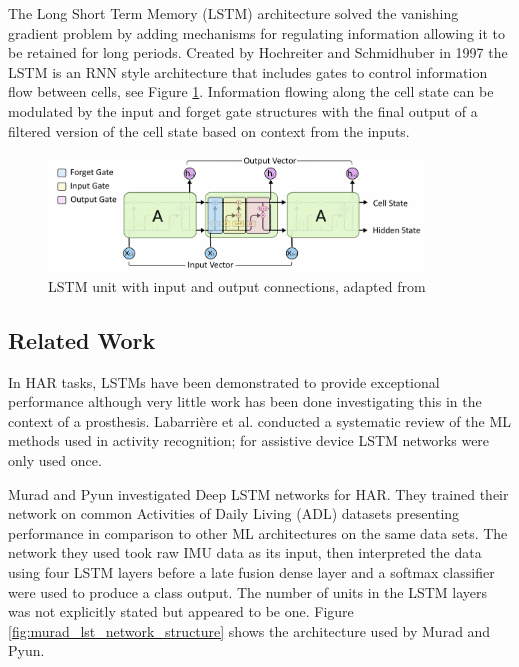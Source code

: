 \documentclass[sensors,article,submit,moreauthors,pdftex]{Definitions/mdpi}
\begin{document}
The Long Short Term Memory (LSTM) architecture solved the vanishing gradient problem by adding mechanisms for regulating information allowing it to be retained for long periods. Created by Hochreiter and Schmidhuber in 1997\cite{Hochreiter1997} the LSTM is an RNN style architecture that includes gates to control information flow between cells, see Figure \ref{fig:lstm_unit}. Information flowing along the cell state can be modulated by the input and forget gate structures with the final output of a filtered version of the cell state based on context from the inputs.\cite{Olah2015}

\begin{figure}[!htb]
    \centering
    \includegraphics[width=0.9\textwidth]{Figures/lstm/lstm_internal_operation.jpg}
    \caption{LSTM unit with input and output connections, adapted from\cite{Olah2015}}
    \label{fig:lstm_unit}
\end{figure}

\subsection{Related Work}
In HAR tasks, LSTMs have been demonstrated to provide exceptional performance\cite{Murad2017} although very little work has been done investigating this in the context of a prosthesis. Labarri\`ere et al. conducted a systematic review of the ML methods used in activity recognition; for assistive device LSTM networks were only used once\cite{Labarriere2020}.

Murad and Pyun investigated Deep LSTM networks for HAR\cite{Murad2017}. They trained their network on common Activities of Daily Living (ADL) datasets presenting performance in comparison to other ML architectures on the same data sets. The network they used took raw IMU data as its input, then interpreted the data using four LSTM layers before a late fusion dense layer and a softmax classifier were used to produce a class output. The number of units in the LSTM layers was not explicitly stated but appeared to be one. Figure \ref{fig:murad_lst_network_structure} shows the architecture used by Murad and Pyun. 
\end{document}
